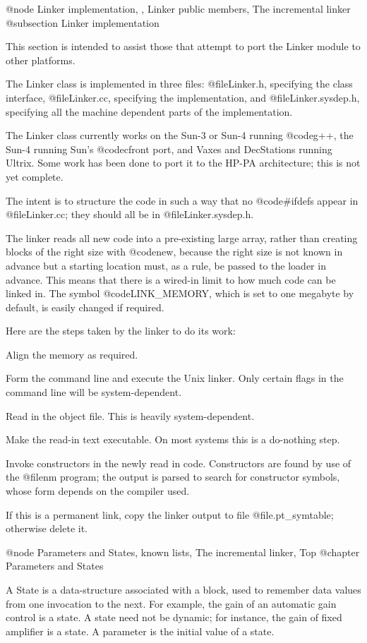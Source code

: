 @node Linker implementation,  , Linker public members, The incremental linker
@subsection Linker implementation

This section is intended to assist those that attempt to port the
Linker module to other platforms.

The Linker class is implemented in three files: @file{Linker.h},
specifying the class interface, @file{Linker.cc}, specifying the
implementation, and @file{Linker.sysdep.h}, specifying all the machine
dependent parts of the implementation.

The Linker class currently works on the Sun-3 or Sun-4 running
@code{g++}, the Sun-4 running Sun's @code{cfront} port, and
Vaxes and DecStations running Ultrix.  Some work has been done to
port it to the HP-PA architecture; this is not yet complete.

The intent is to structure the code in such a way that no @code{#ifdef}s
appear in @file{Linker.cc}; they should all be in @file{Linker.sysdep.h}.

The linker reads all new code into a pre-existing large array, rather
than creating blocks of the right size with @code{new}, because the
right size is not known in advance but a starting location must, as a
rule, be passed to the loader in advance.  This means that there is a
wired-in limit to how much code can be linked in.  The symbol
@code{LINK_MEMORY}, which is set to one megabyte by default, is easily
changed if required.

Here are the steps taken by the linker to do its work:

Align the memory as required.

Form the command line and execute the Unix linker.  Only certain flags
in the command line will be system-dependent.

Read in the object file.  This is heavily system-dependent.

Make the read-in text executable.  On most systems this is a do-nothing
step.

Invoke constructors in the newly read in code.  Constructors are found
by use of the @file{nm} program; the output is parsed to search for
constructor symbols, whose form depends on the compiler used.

If this is a permanent link, copy the linker output to file
@file{.pt_symtable}; otherwise delete it.

@node Parameters and States, known lists, The incremental linker, Top
@chapter Parameters and States

A State is a data-structure associated with a block, used to remember
data values from one invocation to the next.
For example, the gain of an automatic gain control is a state.
A state need not be dynamic; for instance, the gain of fixed
amplifier is a state.  A parameter is the initial value of a state.

